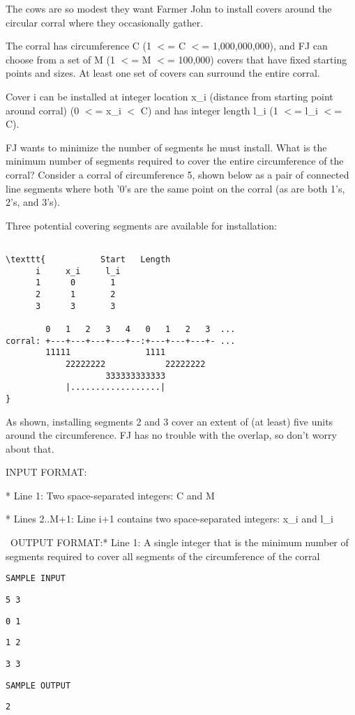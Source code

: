 

The cows are so modest they want Farmer John to install covers around the circular corral where they occasionally gather.

The corral has circumference C (1 $<$= C $<$= 1,000,000,000), and FJ can choose from a set of M (1 $<$= M $<$= 100,000) covers that have fixed starting points and sizes. At least one set of covers can surround the entire corral.

Cover i can be installed at integer location x\_i (distance from starting point around corral) (0 $<$= x\_i $<$ C) and has integer length l\_i (1 $<$= l\_i $<$= C).

FJ wants to minimize the number of segments he must install. What is the minimum number of segments required to cover the entire circumference of the corral? Consider a corral of circumference 5, shown below as a pair of connected line segments where both '0's are the same point on the corral (as are both 1's, 2's, and 3's).

Three potential covering segments are available for installation:
\begin{verbatim}

\texttt{           Start   Length
      i     x_i     l_i
      1      0       1 
      2      1       2 
      3      3       3 

        0   1   2   3   4   0   1   2   3  ... 
corral: +---+---+---+---+--:+---+---+---+- ...
        11111               1111
            22222222            22222222
                    333333333333
            |..................|
}\end{verbatim}

As shown, installing segments 2 and 3 cover an extent of (at least) five units around the circumference. FJ has no trouble with the overlap, so don't worry about that.

INPUT FORMAT:

* Line 1: Two space-separated integers: C and M

* Lines 2..M+1: Line i+1 contains two space-separated integers: x\_i and l\_i

 OUTPUT FORMAT:* Line 1: A single integer that is the minimum number of segments required to cover all segments of the circumference of the corral


\texttt{SAMPLE INPUT}


\texttt{5 3}


\texttt{0 1}


\texttt{1 2}


\texttt{3 3}


\texttt{SAMPLE OUTPUT}


\texttt{2 }